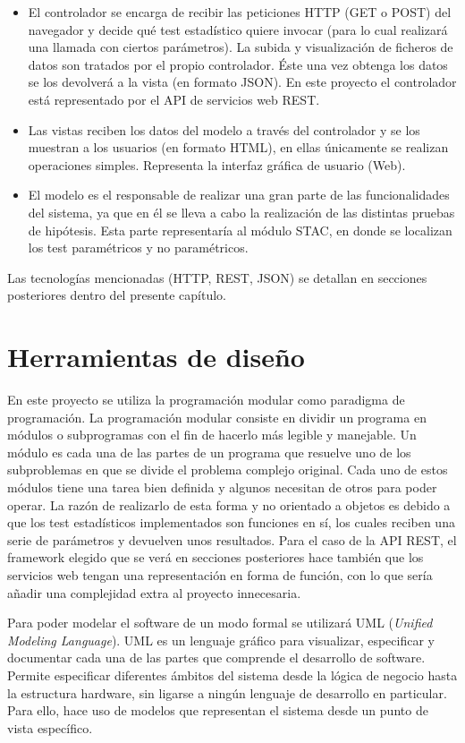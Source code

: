 \begin{itemize}
\item El controlador se encarga de recibir las peticiones HTTP (GET o POST) del navegador y decide qué test estadístico quiere invocar (para lo cual realizará una llamada con ciertos parámetros). La subida y visualización de ficheros de datos son tratados por el propio controlador. Éste una vez obtenga los datos se los devolverá a la vista (en formato JSON). En este proyecto el controlador está representado por el API de servicios web REST.
\item Las vistas reciben los datos del modelo a través del controlador y se los muestran a los usuarios (en formato HTML), en ellas únicamente se realizan operaciones simples. Representa la interfaz gráfica de usuario (Web).
\item El modelo es el responsable de realizar una gran parte de las funcionalidades del sistema, ya que en él se lleva a cabo la realización de las distintas pruebas de hipótesis. Esta parte representaría al módulo STAC, en donde se localizan los test paramétricos y no paramétricos.
\end{itemize}

Las tecnologías mencionadas (HTTP, REST, JSON) se detallan en secciones posteriores dentro del presente capítulo.

\section{Herramientas de diseño}
En este proyecto se utiliza la programación modular como paradigma de programación. La programación modular consiste en dividir un programa en módulos o subprogramas con el fin de hacerlo más legible y manejable. Un módulo es cada una de las partes de un programa que resuelve uno de los subproblemas en que se divide el problema complejo original. Cada uno de estos módulos tiene una tarea bien definida y algunos necesitan de otros para poder operar. La razón de realizarlo de esta forma y no orientado a objetos es debido a que los test estadísticos implementados son funciones en sí, los cuales reciben una serie de parámetros y devuelven unos resultados. Para el caso de la API REST, el framework elegido que se verá en secciones posteriores hace también que los servicios web tengan una representación en forma de función, con lo que sería añadir una complejidad extra al proyecto innecesaria.

Para poder modelar el software de un modo formal se utilizará UML (\textit{Unified Modeling Language}). UML es un lenguaje gráfico para visualizar, especificar y documentar cada una de las partes que comprende el desarrollo de software. Permite especificar diferentes ámbitos del sistema desde la lógica de negocio hasta la estructura hardware, sin ligarse a ningún lenguaje de desarrollo en particular. Para ello, hace uso de modelos que representan el sistema desde un punto de vista específico.

